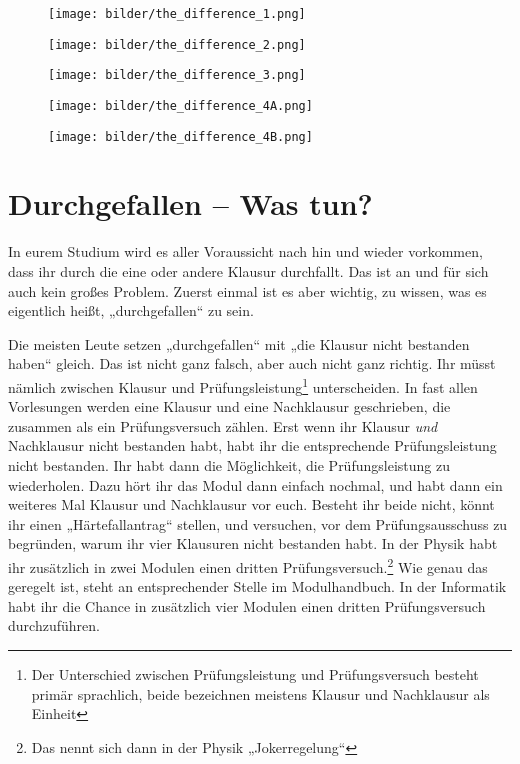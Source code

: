 \newpage


\begin{figure*}[t]
    \centering
    \begin{subfigure}[b]{.18\textwidth}
    \texttt{[image: bilder/the\_difference\_1.png]}	    
    \end{subfigure}
    \begin{subfigure}[b]{.18\textwidth}
    \texttt{[image: bilder/the\_difference\_2.png]}
    \end{subfigure}
    \begin{subfigure}[b]{.18\textwidth}
    \texttt{[image: bilder/the\_difference\_3.png]}
    \end{subfigure}
    \begin{subfigure}[b]{.18\textwidth}
    \texttt{[image: bilder/the\_difference\_4A.png]}
    \end{subfigure}
    \begin{subfigure}[b]{.18\textwidth}
    \texttt{[image: bilder/the\_difference\_4B.png]}
    \end{subfigure}
\end{figure*}

\section{Durchgefallen -- Was tun?}

In eurem Studium wird es aller Voraussicht nach hin und wieder vorkommen, dass ihr durch die eine oder andere Klausur durchfallt. Das ist an und für sich auch kein großes Problem. Zuerst einmal ist es aber wichtig, zu wissen, was es eigentlich heißt, „durchgefallen“ zu sein.

Die meisten Leute setzen „durchgefallen“ mit „die Klausur nicht bestanden haben“ gleich. Das ist nicht ganz falsch, aber auch nicht ganz richtig. Ihr müsst nämlich zwischen Klausur und Prüfungsleistung\footnote{ Der Unterschied zwischen Prüfungsleistung und Prüfungsversuch besteht primär sprachlich, beide bezeichnen meistens Klausur und Nachklausur als Einheit} unterscheiden. In fast allen Vorlesungen werden eine Klausur und eine Nachklausur geschrieben, die zusammen als ein Prüfungsversuch zählen. Erst wenn ihr Klausur \emph{und} Nachklausur nicht bestanden habt, habt ihr die entsprechende Prüfungsleistung nicht bestanden. Ihr habt dann die Möglichkeit, die Prüfungsleistung zu wiederholen. Dazu hört ihr das Modul dann einfach nochmal, und habt dann ein weiteres Mal Klausur und Nachklausur vor euch. Besteht ihr beide nicht, könnt ihr einen „Härtefallantrag“ stellen, und versuchen, vor dem Prüfungsausschuss zu begründen, warum ihr vier Klausuren nicht bestanden habt. In der Physik habt ihr zusätzlich in zwei Modulen einen dritten Prüfungsversuch.\footnote{Das nennt sich dann in der Physik „Jokerregelung“} Wie genau das geregelt ist, steht an entsprechender Stelle im Modulhandbuch. In der Informatik habt ihr die Chance in zusätzlich vier Modulen einen dritten Prüfungsversuch durchzuführen.

